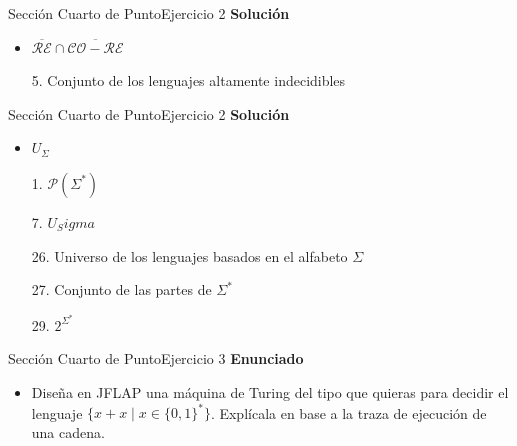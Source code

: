 \documentclass[10pt, envcountsect, presentation, aspectratio=169]{beamer}
\begin{document}

\begin{frame}{Sección Cuarto de Punto}{Ejercicio 2}
    \textbf{Solución}\\
    \begin{itemize}
        \item $\overline{\mathcal{RE}} \cap \overline{\mathcal{CO-RE}}$
        \item[5.] Conjunto de los lenguajes altamente indecidibles
    \end{itemize}
\end{frame}


\begin{frame}{Sección Cuarto de Punto}{Ejercicio 2}
    \textbf{Solución}\\
    \begin{itemize}
        \item $U_\Sigma$
        \item[1.] $\mathcal{P}(\Sigma^*)$
        \item[7.] $U_Sigma$
        \item[26.] Universo de los lenguajes basados en el alfabeto $\Sigma$
        \item[27.] Conjunto de las partes de $\Sigma^*$
        \item[29.] $2^{\Sigma^*}$
    \end{itemize}
\end{frame}


\begin{frame}{Sección Cuarto de Punto}{Ejercicio 3}
\textbf{Enunciado}
	\begin{itemize}
        \item Diseña en JFLAP una máquina de Turing del tipo que quieras para decidir el lenguaje $\{x+x \mid x\in\{0,1\}^*\}$. Explícala en base a la traza de ejecución de una cadena.
	\end{itemize}
\end{frame}

\end{document}
